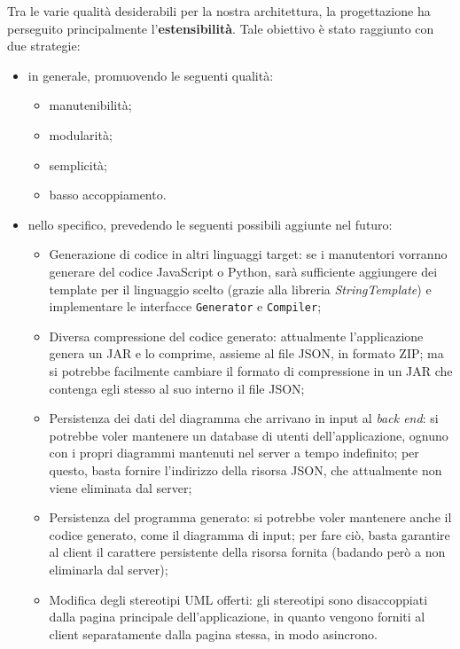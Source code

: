 Tra le varie qualità desiderabili per la nostra architettura, la progettazione ha perseguito principalmente l'\textbf{estensibilità}. Tale obiettivo è stato raggiunto con due strategie:
\begin{itemize}
	\item in generale, promuovendo le seguenti qualità:
	\begin{itemize}
		\item manutenibilità;
		\item modularità;
		\item semplicità;
		\item basso accoppiamento.
	\end{itemize}
	\item nello specifico, prevedendo le seguenti possibili aggiunte nel futuro:
	\begin{itemize}
		\item Generazione di codice in altri linguaggi target: se i manutentori vorranno generare del codice JavaScript o Python, sarà sufficiente aggiungere dei template per il linguaggio scelto (grazie alla libreria \emph{StringTemplate}) e implementare le interfacce \texttt{Generator} e \texttt{Compiler};
		\item Diversa compressione del codice generato: attualmente l'applicazione genera un JAR e lo comprime, assieme al file JSON, in formato ZIP; ma si potrebbe facilmente cambiare il formato di compressione in un JAR che contenga egli stesso al suo interno il file JSON;
		\item Persistenza dei dati del diagramma che arrivano in input al \emph{back end}: si potrebbe voler mantenere un database di utenti dell'applicazione, ognuno con i propri diagrammi mantenuti nel server a tempo indefinito; per questo, basta fornire l'indirizzo della risorsa JSON, che attualmente non viene eliminata dal server; %
		\item Persistenza del programma generato: si potrebbe voler mantenere anche il codice generato, come il diagramma di input; per fare ciò, basta garantire al client il carattere persistente della risorsa fornita (badando però a non eliminarla dal server); %
		\item Modifica degli stereotipi UML offerti: gli stereotipi sono disaccoppiati dalla pagina principale dell'applicazione, in quanto vengono forniti al client separatamente dalla pagina stessa, in modo asincrono.
	\end{itemize}
\end{itemize}



